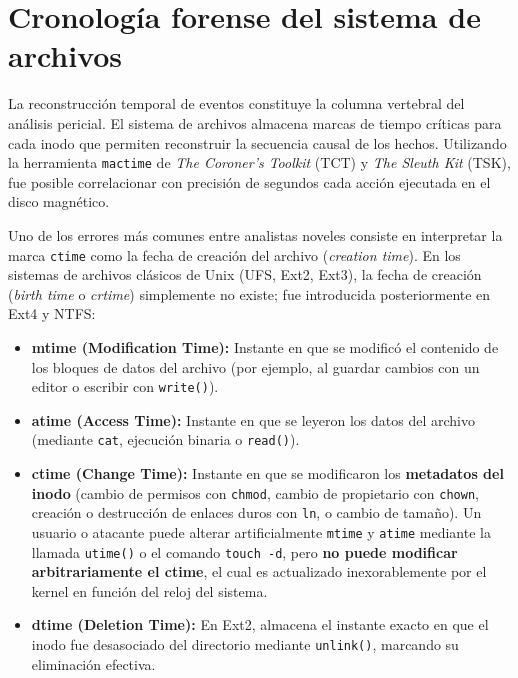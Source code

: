 \chapter{Cronología forense del sistema de archivos}

La reconstrucción temporal de eventos constituye la columna vertebral del análisis pericial. El sistema de archivos almacena marcas de tiempo críticas para cada inodo que permiten reconstruir la secuencia causal de los hechos. Utilizando la herramienta \texttt{mactime} de \textit{The Coroner's Toolkit} (TCT) y \textit{The Sleuth Kit} (TSK), fue posible correlacionar con precisión de segundos cada acción ejecutada en el disco magnético.

\begin{notaforense}
Uno de los errores más comunes entre analistas noveles consiste en interpretar la marca \texttt{ctime} como la fecha de creación del archivo (\textit{creation time}). En los sistemas de archivos clásicos de Unix (UFS, Ext2, Ext3), la fecha de creación (\textit{birth time} o \textit{crtime}) simplemente no existe; fue introducida posteriormente en Ext4 y NTFS:
\begin{itemize}
    \item \textbf{mtime (Modification Time):} Instante en que se modificó el contenido de los bloques de datos del archivo (por ejemplo, al guardar cambios con un editor o escribir con \texttt{write()}).
    \item \textbf{atime (Access Time):} Instante en que se leyeron los datos del archivo (mediante \texttt{cat}, ejecución binaria o \texttt{read()}).
    \item \textbf{ctime (Change Time):} Instante en que se modificaron los \textbf{metadatos del inodo} (cambio de permisos con \texttt{chmod}, cambio de propietario con \texttt{chown}, creación o destrucción de enlaces duros con \texttt{ln}, o cambio de tamaño). Un usuario o atacante puede alterar artificialmente \texttt{mtime} y \texttt{atime} mediante la llamada \texttt{utime()} o el comando \texttt{touch -d}, pero \textbf{no puede modificar arbitrariamente el ctime}, el cual es actualizado inexorablemente por el kernel en función del reloj del sistema.
    \item \textbf{dtime (Deletion Time):} En Ext2, almacena el instante exacto en que el inodo fue desasociado del directorio mediante \texttt{unlink()}, marcando su eliminación efectiva.
\end{itemize}
\end{notaforense}

